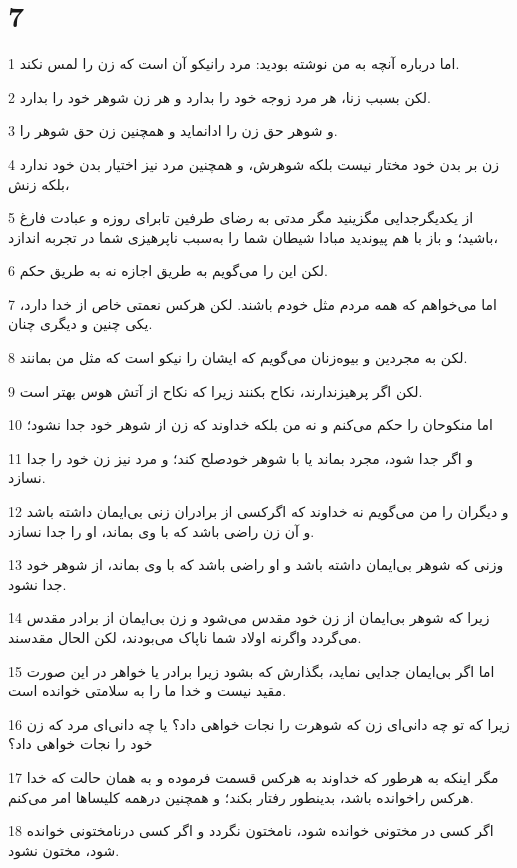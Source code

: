 \chapter{7}

\par 1 اما درباره آنچه به من نوشته بودید: مرد رانیکو آن است که زن را لمس نکند.
\par 2 لکن بسبب زنا، هر مرد زوجه خود را بدارد و هر زن شوهر خود را بدارد.
\par 3 و شوهر حق زن را ادانماید و همچنین زن حق شوهر را.
\par 4 زن بر بدن خود مختار نیست بلکه شوهرش، و همچنین مرد نیز اختیار بدن خود ندارد بلکه زنش،
\par 5 از یکدیگرجدایی مگزینید مگر مدتی به رضای طرفین تابرای روزه و عبادت فارغ باشید؛ و باز با هم پیوندید مبادا شیطان شما را به‌سبب ناپرهیزی شما در تجربه اندازد،
\par 6 لکن این را می‌گویم به طریق اجازه نه به طریق حکم.
\par 7 اما می‌خواهم که همه مردم مثل خودم باشند. لکن هرکس نعمتی خاص از خدا دارد، یکی چنین و دیگری چنان.
\par 8 لکن به مجردین و بیوه‌زنان می‌گویم که ایشان را نیکو است که مثل من بمانند.
\par 9 لکن اگر پرهیزندارند، نکاح بکنند زیرا که نکاح از آتش هوس بهتر است.
\par 10 اما منکوحان را حکم می‌کنم و نه من بلکه خداوند که زن از شوهر خود جدا نشود؛
\par 11 و اگر جدا شود، مجرد بماند یا با شوهر خودصلح کند؛ و مرد نیز زن خود را جدا نسازد.
\par 12 و دیگران را من می‌گویم نه خداوند که اگرکسی از برادران زنی بی‌ایمان داشته باشد و آن زن راضی باشد که با وی بماند، او را جدا نسازد.
\par 13 وزنی که شوهر بی‌ایمان داشته باشد و او راضی باشد که با وی بماند، از شوهر خود جدا نشود.
\par 14 زیرا که شوهر بی‌ایمان از زن خود مقدس می‌شود و زن بی‌ایمان از برادر مقدس می‌گردد واگرنه اولاد شما ناپاک می‌بودند، لکن الحال مقدسند.
\par 15 اما اگر بی‌ایمان جدایی نماید، بگذارش که بشود زیرا برادر یا خواهر در این صورت مقید نیست و خدا ما را به سلامتی خوانده است.
\par 16 زیرا که تو چه دانی‌ای زن که شوهرت را نجات خواهی داد؟ یا چه دانی‌ای مرد که زن خود را نجات خواهی داد؟
\par 17 مگر اینکه به هرطور که خداوند به هرکس قسمت فرموده و به همان حالت که خدا هرکس راخوانده باشد، بدینطور رفتار بکند؛ و همچنین درهمه کلیساها امر می‌کنم.
\par 18 اگر کسی در مختونی خوانده شود، نامختون نگردد و اگر کسی درنامختونی خوانده شود، مختون نشود.
